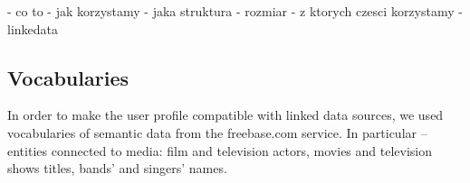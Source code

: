 - co to
- jak korzystamy
- jaka struktura
- rozmiar
- z ktorych czesci korzystamy
- linkedata

\subsection{Vocabularies}
In order to make the user profile compatible with linked data sources, we used
vocabularies of semantic data from the freebase.com service. In particular --
entities connected to media: film and television actors, movies and television
shows titles, bands' and singers' names.